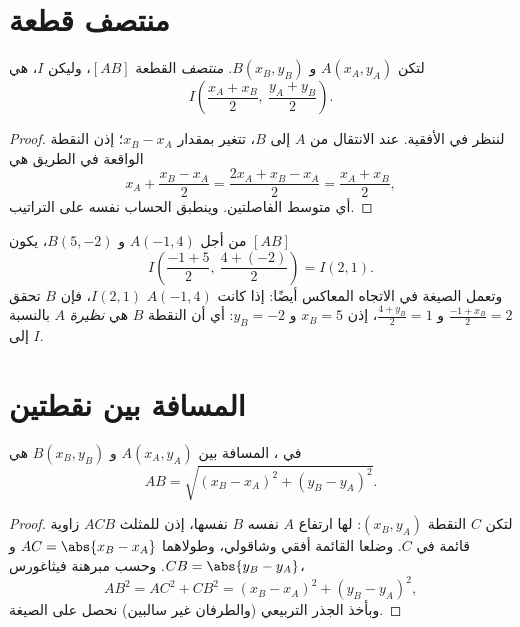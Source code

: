 \section{منتصف قطعة}

\begin{proposition}\label{prop:g10:coordgeom:midpoint}
لتكن $A(x_A, y_A)$ و $B(x_B, y_B)$.  \emph{منتصف}
القطعة $[AB]$، وليكن $I$، هي
\[
I\left(\frac{x_A + x_B}{2},\ \frac{y_A + y_B}{2}\right).
\]
\end{proposition}

\begin{proof}
لننظر في  الأفقية. عند الانتقال من $A$ إلى $B$، تتغير 
بمقدار $x_B - x_A$؛ إذن  النقطة الواقعة في  الطريق هي
\[
x_A + \frac{x_B - x_A}{2} = \frac{2x_A + x_B - x_A}{2}
= \frac{x_A + x_B}{2},
\]
أي متوسط الفاصلتين. وينطبق الحساب نفسه على
التراتيب.
\end{proof}

\begin{example}\label{ex:g10:coordgeom:midpoint}
من أجل $A(-1, 4)$ و $B(5, -2)$، يكون  $[AB]$
\[
I\left(\frac{-1 + 5}{2},\ \frac{4 + (-2)}{2}\right) = I(2, 1).
\]
وتعمل الصيغة في الاتجاه المعاكس أيضًا: إذا كانت $A(-1, 4)$ 
$I(2, 1)$، فإن $B$ تحقق $\frac{-1 + x_B}{2} = 2$ و
$\frac{4 + y_B}{2} = 1$، إذن $x_B = 5$ و $y_B = -2$: أي أن النقطة $B$ هي
\emph{نظيرة} $A$ بالنسبة إلى $I$.
\end{example}

\section{المسافة بين نقطتين}

\begin{theorem}\label{thm:g10:coordgeom:distance}
في ، المسافة بين $A(x_A, y_A)$ و
$B(x_B, y_B)$ هي
\[
AB = \sqrt{(x_B - x_A)^2 + (y_B - y_A)^2}.
\]
\end{theorem}

\begin{proof}
لتكن $C$ النقطة $(x_B, y_A)$: لها ارتفاع $A$ نفسه 
$B$ نفسها، إذن للمثلث $ACB$ زاوية قائمة في $C$. وضلعا
القائمة أفقي وشاقولي، وطولاهما
$AC = \abs{x_B - x_A}$ و $CB = \abs{y_B - y_A}$. وحسب مبرهنة
فيثاغورس،
\[
AB^2 = AC^2 + CB^2 = (x_B - x_A)^2 + (y_B - y_A)^2,
\]
وبأخذ الجذر التربيعي (والطرفان غير سالبين) نحصل على الصيغة.
\end{proof}

